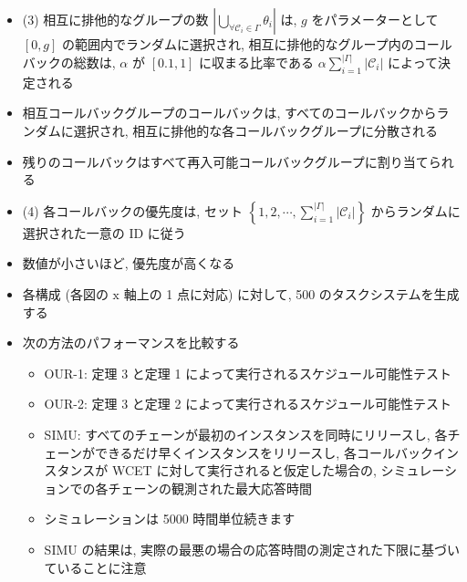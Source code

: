 \begin{frame}{}
    \begin{itemize}
        \item (3) 相互に排他的なグループの数 $\left|\bigcup_{\forall \mathcal{C}_{i} \in \Gamma} \theta_{i}\right|$ は, $g$ をパラメーターとして $[0, g]$ の範囲内でランダムに選択され, 相互に排他的なグループ内のコールバックの総数は, $\alpha$ が $[0.1,1]$ に収まる比率である $\alpha \sum_{i=1}^{|\Gamma|}\left|\mathcal{C}_{i}\right|$ によって決定される
\item 相互コールバックグループのコールバックは, すべてのコールバックからランダムに選択され, 相互に排他的な各コールバックグループに分散される
\item 残りのコールバックはすべて再入可能コールバックグループに割り当てられる
\item (4) 各コールバックの優先度は, セット $\left\{1,2, \cdots, \sum_{i=1}^{|\Gamma|}\left|\mathcal{C}_{i}\right|\right\}$ からランダムに選択された一意の ID に従う
\item 数値が小さいほど, 優先度が高くなる
    \end{itemize}
\end{frame}

\begin{frame}{}
    \begin{itemize}
        \item 各構成 (各図の $\mathrm{x}$ 軸上の 1 点に対応) に対して, 500 のタスクシステムを生成する
\item 次の方法のパフォーマンスを比較する
              \begin{itemize}
                  \item  OUR-1: 定理 3 と定理 1 によって実行されるスケジュール可能性テスト

                  \item  OUR-2: 定理 3 と定理 2 によって実行されるスケジュール可能性テスト

                  \item  SIMU: すべてのチェーンが最初のインスタンスを同時にリリースし, 各チェーンができるだけ早くインスタンスをリリースし, 各コールバックインスタンスが WCET に対して実行されると仮定した場合の, シミュレーションでの各チェーンの観測された最大応答時間
\item シミュレーションは 5000 時間単位続きます
\item SIMU の結果は, 実際の最悪の場合の応答時間の測定された下限に基づいていることに注意

              \end{itemize}
    \end{itemize}
\end{frame}

